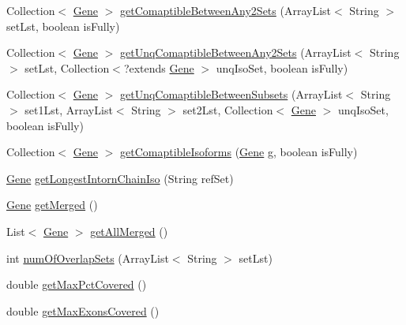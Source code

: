 \begin{DoxyCompactItemize}
\item 
Collection$<$ \hyperlink{classumms_1_1core_1_1annotation_1_1_gene}{Gene} $>$ \hyperlink{classbroad_1_1pda_1_1annotation_1_1_locus_a605c39f1d3fdd54f354087b8b49fbbfb}{get\+Comaptible\+Between\+Any2\+Sets} (Array\+List$<$ String $>$ set\+Lst, boolean is\+Fully)
\item 
Collection$<$ \hyperlink{classumms_1_1core_1_1annotation_1_1_gene}{Gene} $>$ \hyperlink{classbroad_1_1pda_1_1annotation_1_1_locus_a9505fde35b8cb334a7103cf2611ef899}{get\+Unq\+Comaptible\+Between\+Any2\+Sets} (Array\+List$<$ String $>$ set\+Lst, Collection$<$?extends \hyperlink{classumms_1_1core_1_1annotation_1_1_gene}{Gene} $>$ unq\+Iso\+Set, boolean is\+Fully)
\item 
Collection$<$ \hyperlink{classumms_1_1core_1_1annotation_1_1_gene}{Gene} $>$ \hyperlink{classbroad_1_1pda_1_1annotation_1_1_locus_a333584ce51e5c6f1a2f00c2ad0586fea}{get\+Unq\+Comaptible\+Between\+Subsets} (Array\+List$<$ String $>$ set1\+Lst, Array\+List$<$ String $>$ set2\+Lst, Collection$<$ \hyperlink{classumms_1_1core_1_1annotation_1_1_gene}{Gene} $>$ unq\+Iso\+Set, boolean is\+Fully)
\item 
Collection$<$ \hyperlink{classumms_1_1core_1_1annotation_1_1_gene}{Gene} $>$ \hyperlink{classbroad_1_1pda_1_1annotation_1_1_locus_a5efc45d71e297a4996655b451accd1a3}{get\+Comaptible\+Isoforms} (\hyperlink{classumms_1_1core_1_1annotation_1_1_gene}{Gene} g, boolean is\+Fully)
\item 
\hyperlink{classumms_1_1core_1_1annotation_1_1_gene}{Gene} \hyperlink{classbroad_1_1pda_1_1annotation_1_1_locus_aac5b8bb5955d907402dba1f158c9d266}{get\+Longest\+Intorn\+Chain\+Iso} (String ref\+Set)
\item 
\hyperlink{classumms_1_1core_1_1annotation_1_1_gene}{Gene} \hyperlink{classbroad_1_1pda_1_1annotation_1_1_locus_ab86206c127ee93f5aa36fdec5c7a7f30}{get\+Merged} ()
\item 
List$<$ \hyperlink{classumms_1_1core_1_1annotation_1_1_gene}{Gene} $>$ \hyperlink{classbroad_1_1pda_1_1annotation_1_1_locus_a20a429f963554d39be7c3a02a410b534}{get\+All\+Merged} ()
\item 
int \hyperlink{classbroad_1_1pda_1_1annotation_1_1_locus_a2ad7d79e3ee59415520e9f3c688725cc}{num\+Of\+Overlap\+Sets} (Array\+List$<$ String $>$ set\+Lst)
\item 
double \hyperlink{classbroad_1_1pda_1_1annotation_1_1_locus_ac7a725bf08ba1f907352e743037e453b}{get\+Max\+Pct\+Covered} ()
\item 
double \hyperlink{classbroad_1_1pda_1_1annotation_1_1_locus_ab6466dfa65c9a7701bd066379301a01a}{get\+Max\+Exons\+Covered} ()

\end{DoxyCompactItemize}

